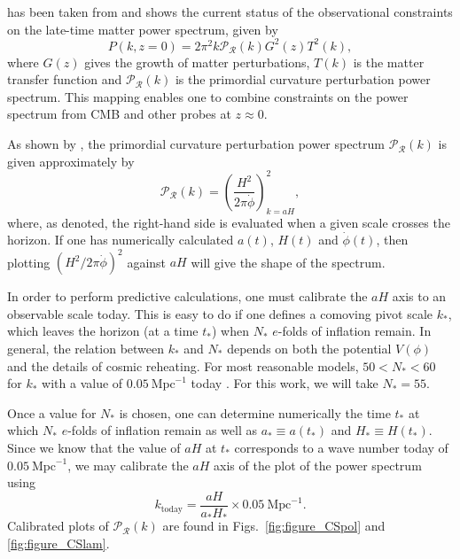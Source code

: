 has been taken from
\citet{hlozek_atacama_2012} and shows the current status of the
observational constraints on the late-time matter power spectrum,
given by
%
\begin{equation}
  P(k,z=0) = 2\pi^2 k \mathcal{P}_\mathcal{R}(k) G^2(z) T^2(k),
\end{equation}
%
where $G(z)$ gives the growth of matter perturbations, $T(k)$ is the
matter transfer function and $\mathcal{P}_\mathcal{R}(k)$ is the
primordial curvature perturbation power spectrum. This mapping enables
one to combine constraints on the power spectrum from CMB and other
probes at $z\approx 0$.




As shown by \citet{liddle_cosmological_2000}, the primordial curvature
perturbation power spectrum $\mathcal{P}_{\mathcal{R}}(k)$ is given
approximately by
%
\begin{equation}
  \mathcal{P}_{\mathcal{R}}(k)
  =
  \left(\frac{H^2}{2\pi\dot{\phi}}\right)^2_{k=a H},
  \label{eqn:curvature_power_spectrum}
\end{equation}
%
where, as denoted, the right-hand side is evaluated when a given scale
crosses the horizon. If one has numerically calculated $a(t)$, $H(t)$ and
$\dot{\phi}(t)$, then plotting $\left(H^2/ 2\pi\dot{\phi}\right)^2$
against $aH$ will give the shape of the spectrum.

In order to perform predictive calculations, one must calibrate the
$aH$ axis to an observable scale today. This is easy to do if one
defines a comoving pivot scale $k_*$, which leaves the horizon (at a
time $t_*$) when $N_*$ $e$-folds of inflation remain. In general, the
relation between $k_*$ and $N_*$ depends on both the potential
$V(\phi)$ and the details of cosmic reheating. For most reasonable
models, $50<N_*<60$  for $k_*$ with a value of
$0.05\:\mathrm{Mpc}^{-1}$ today
\citep{planck_collaboration_planck_2013-1}. For this work, we will
take $N_*=55$. 

Once a value for $N_*$ is chosen, one can determine numerically the
time $t_*$ at which $N_*$ $e$-folds of inflation remain as well as
$a_*\equiv a(t_*)$ and $H_*\equiv H(t_*)$. Since we know that the
value of $aH$ at $t_*$ corresponds to a wave number today of
$0.05\:\mathrm{Mpc}^{-1}$, we may calibrate the $aH$ axis of the plot
of the power spectrum using
%
\begin{equation}
  k_\mathrm{today} 
  = 
  \frac{aH}{a_*H_*}\times0.05\:\mathrm{Mpc}^{-1}.
\end{equation}
%
Calibrated plots of $\mathcal{P}_\mathcal{R}(k)$ are found in
Figs.\ \nolinebreak\ref{fig:figure_CSpol} and \nolinebreak\ref{fig:figure_CSlam}. 



